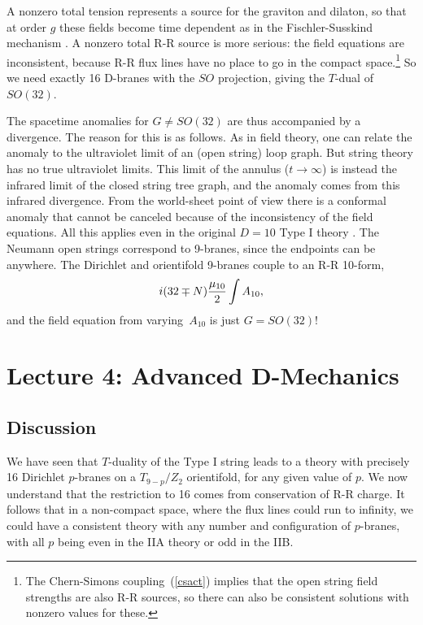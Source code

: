 \documentclass[12pt]{article}
\def\be{\begin{equation}}
\def\ee{\end{equation}}
\begin{document}
A nonzero total tension represents a source for the graviton and dilaton,
so that at order $g$ these fields become time dependent as in the
Fischler-Susskind mechanism \cite{fsuss}.
A nonzero total R-R source is more serious: the field equations are
inconsistent, because R-R flux lines have no place to go in the compact
space.\footnote
{The Chern-Simons coupling~(\ref{csact}) implies that the open
string field strengths are also R-R sources, so there can also be
consistent solutions with nonzero values for these.}
So we need exactly 16
D-branes with the $SO$ projection, giving the $T$-dual of $SO(32)$.  

The spacetime anomalies for $G \neq SO(32)$ are thus accompanied by a
divergence\cite{gsdiv}.  The reason for this is as follows.  As in field
theory, one can relate the anomaly to the ultraviolet limit of an (open
string) loop graph.  But string theory has no true ultraviolet limits.  This
limit of the annulus ($t\to \infty$) is instead the infrared limit of the
closed string tree graph, and the anomaly comes from this infrared
divergence.  From the 
world-sheet point of view there is a conformal anomaly that cannot be
canceled because of the inconsistency of the field equations.  All this
applies even in the original $D=10$ Type I theory \cite{rrex}.  The Neumann
open strings correspond to 9-branes, since the endpoints can be anywhere. 
The Dirichlet and orientifold 9-branes couple to an R-R 10-form,
\be
i (32 \mp N) {\mu_{10}\over 2} \int A_{10} ,
\ee
and the field equation from varying~$A_{10}$ is just $G =
SO(32)$! \cite{rrex}

\section{Lecture 4: Advanced D-Mechanics}

\subsection{Discussion}

We have seen that $T$-duality of the Type I string leads to a theory with
precisely 16 Dirichlet $p$-branes on a $T_{9-p}/Z_2$ orientifold, for any
given value of $p$.
We now understand that the restriction to 16 comes
from conservation of R-R charge.  It follows that in a non-compact space,
where the flux lines could run to infinity, we could have a consistent
theory with any number and configuration of $p$-branes, with all $p$
being even in the IIA theory or odd in the IIB.  
\end{document}
